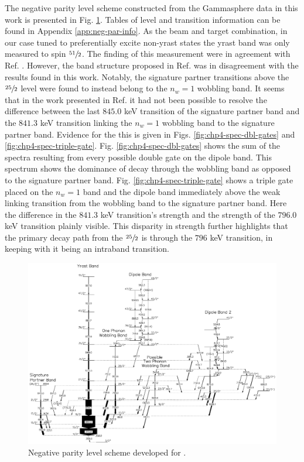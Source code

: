 The negative parity level scheme constructed from the Gammasphere data in this work is presented in Fig. \ref{fig:chp4-neg-par-lvl-schm}. Tables of level and transition information can be found in Appendix \ref{app:neg-par-info}. As the beam and target combination, in our case tuned to preferentially excite non-yrast states the yrast band was only measured to spin $\sfrac{51}{2}$. The finding of this measurement were in agreement with Ref. \cite{ePaul135Pr}. However, the band structure proposed in Ref. \cite{semkow135Pr} was in disagreement with the results found in this work. Notably, the signature partner transitions above the $\sfrac{25}{2}$ level were found to instead belong to the $n_w=1$ wobbling band. It seems that in the work presented in Ref. \cite{semkow135Pr} it had not been possible to resolve the difference between the last $845.0$ keV transition of the signature partner band and the $841.3$ keV transition linking the $n_w=1$ wobbling band to the signature partner band. Evidence for the this is given in Figs. \ref{fig:chp4-spec-dbl-gates} and \ref{fig:chp4-spec-triple-gate}. Fig. \ref{fig:chp4-spec-dbl-gates} shows the sum of the spectra resulting from every possible double gate on the dipole band. This spectrum shows the dominance of decay through the wobbling band as opposed to the signature partner band. Fig. \ref{fig:chp4-spec-triple-gate} shows a triple gate placed on the $n_w=1$ band and the dipole band immediately above the weak linking transition from the wobbling band to the signature partner band. Here the difference in the $841.3$ keV transition's strength and the strength of the $796.0$ keV transition plainly visible. This disparity in strength further highlights that the primary decay path from the $\sfrac{25}{2}$ is through the $796$ keV transition, in keeping with it being an intraband transition.

\begin{landscape}
\begin{figure}[h!]
\centerline{\includegraphics[height=0.9\textheight]{./img/c4/135Pr_Np_for_diss.pdf}}
	\caption{Negative parity level scheme developed for \pr{}. \label{fig:chp4-neg-par-lvl-schm}}
\end{figure}
\end{landscape}

